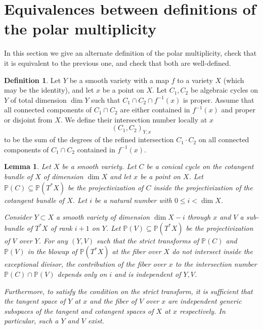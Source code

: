 \documentclass[12pt]{amsart}
\newtheorem{lemma}[theorem]{Lemma}
\theoremstyle{definition}
\newtheorem{defi}[theorem]{Definition}
\theoremstyle{remark}
\begin{document}
\section{Equivalences between definitions of the polar multiplicity}\label{equivalences}

In this section we give an alternate definition of the polar multiplicity, check that it is equivalent to the previous one, and check that both are well-defined.


\begin{defi} Let $Y$ be a smooth variety with a map $f$ to a variety $X$ (which may be the identity), and let $x$ be a point on $X$. Let $C_1, C_2$ be algebraic cycles on $Y$ of total dimension $\dim Y$ such that $C_1 \cap C_2 \cap f^{-1}(x)$ is proper. Assume that all connected components of $C_1 \cap C_2$ are either contained in $f^{-1}(x)$ and proper or disjoint from $X$. We define their intersection number locally at $x$  \[ (C_1,C_2)_{Y, x} \] to be the sum of the degrees of the refined intersection $C_1 \cdot C_2$ \cite[p. 131]{Fulton} on all connected components of $C_1 \cap C_2$ contained in $f^{-1}(x)$. \end{defi} 


\begin{lemma}\label{intersection-comparison} Let $X$ be a smooth variety. Let $C$ be a conical cycle on the cotangent bundle of $X$ of dimension $\dim X$ and let $x$ be a point on $X$.  Let $\mathbb P(C) \subseteq \mathbb P (T^* X)$ be the projectivization of $C$ inside the projectivization of the cotangent bundle of $X$. Let $i$ be a natural number with $0 \leq i < \dim X$.

Consider $Y \subset X$ a smooth variety of dimension $\dim X-i$ through $x$ and $V$ a sub-bundle of $T^* X$  of rank $i+1$ on $Y$.  Let $\mathbb P(V) \subseteq \mathbb P( T^* X)$ be the projectivization of $V$ over $Y$. For any $(Y,V)$ such that the strict transforms of $\mathbb P(C)$ and $\mathbb P(V)$ in the blowup of $\mathbb P(T^* X)$ at the fiber over $X$ do not intersect inside the exceptional divisor, the contribution of the fiber over $x$ to the intersection number $\mathbb P(C) \cap \mathbb P(V)$ depends only on $i$ and is independent of $Y,V$.

Furthermore, to satisfy the condition on the strict transform, it is sufficient that the tangent space of $Y$ at $x$ and the fiber of $V$ over $x$ are independent generic subspaces of the tangent and cotangent spaces of $X$ at $x$ respectively. In particular, such a $Y$ and $V$ exist.\end{lemma}
\end{document}
